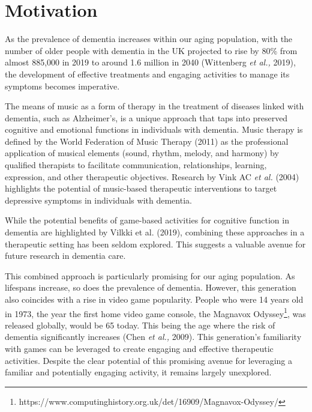 \documentclass{l4proj}
\begin{document}
\section{Motivation}

As the prevalence of dementia increases within our aging population, with the number of older people with dementia in the UK projected to rise by 80\% from almost 885,000 in 2019 to around 1.6 million in 2040 (Wittenberg \emph{et al.,} 2019), the development of effective treatments and engaging activities to manage its symptoms becomes imperative.

The means of music as a form of therapy in the treatment of diseases linked with dementia, such as Alzheimer's, is a unique approach that taps into preserved cognitive and emotional functions in individuals with dementia. Music therapy is defined by the World Federation of Music Therapy (2011) as the professional application of musical elements (sound, rhythm, melody, and harmony) by qualified therapists to facilitate communication, relationships, learning, expression, and other therapeutic objectives. Research by Vink AC \emph{et al.} (2004) highlights the potential of music-based therapeutic interventions to target depressive symptoms in individuals with dementia.


While the potential benefits of game-based activities for cognitive function in dementia are highlighted by Vilkki et al. (2019), combining these approaches in a therapeutic setting has been seldom explored. This suggests a valuable avenue for future research in dementia care.

This combined approach is particularly promising for our aging population. As lifespans increase, so does the prevalence of dementia. However, this generation also coincides with a rise in video game popularity. People who were 14 years old in 1973, the year the first home video game console, the Magnavox Odyssey\footnote{https://www.computinghistory.org.uk/det/16909/Magnavox-Odyssey/}, was released globally, would be 65 today. This being the age where the risk of dementia significantly increases (Chen \emph{et al.,} 2009). This generation's familiarity with games can be leveraged to create engaging and effective therapeutic activities. Despite the clear potential of this promising avenue for leveraging a familiar and potentially engaging activity, it remains largely unexplored.

\end{document}
